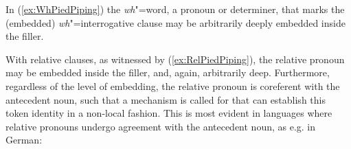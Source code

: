 \documentclass[output=paper
                ,modfonts
                ,nonflat
	        ,collection
	        ,collectionchapter
	        ,collectiontoclongg
 	        ,biblatex
                ,babelshorthands
                ,newtxmath
                ,draftmode
                ,colorlinks, citecolor=brown
]{./langsci/langscibook}
\begin{document}
{\begin{exe}
  \ex \label{ex:WhPiedPiping}
  \begin{xlist}
  \end{xlist}
\end{exe}

\begin{exe}
  \ex \label{ex:RelPiedPiping}
  \begin{xlist}
  \end{xlist}
\end{exe}

\noindent
In (\ref{ex:WhPiedPiping}) the \emph{wh}"=word, a pronoun or determiner, that
marks the (embedded) \emph{wh}"=interrogative clause may be arbitrarily deeply embedded inside the filler.  

With relative clauses, as witnessed by (\ref{ex:RelPiedPiping}), the
relative pronoun may be embedded inside the filler, and, again,
arbitrarily deep. Furthermore, regardless of the level of embedding,
the relative pronoun is coreferent with the antecedent noun, such that
a mechanism is called for that can establish this token identity in a
non-local fashion. This is most evident in languages where relative
pronouns undergo agreement with the antecedent noun, as e.g. in
German:

}
\end{document}
